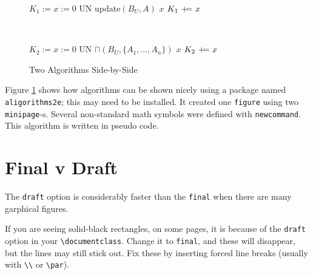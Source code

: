 \begin{figure}[h]
\begin{minipage}{.45\textwidth}
\begin{algorithm}[H]
  $K_1  := x := 0$\;
   {
    UN \bang update$(B_U, A)$ \query $x$\;
    $K_1 \protect{~+{\kern -0.5em}=~} x$\;
  }
~\\
  \caption{$A \sqsubseteq B \Rightarrow U[B] \sqsubseteq U[A]$}
  \label{pseudo-R1-2}
\end{algorithm}
\end{minipage}                  %
~\textcolor{blue}{\vrule}~
\begin{minipage}{.6\textwidth}
\begin{algorithm}[H]
  $K_2 := x := 0$\;
   {
    UN \bang $\sqcap(B_U, \{A_1, \dots, A_n\})$ \query $x$\;
    $K_2 \protect{~+{\kern -0.5em}=~} x$\;
  }
  \label{pseudo-R2-2}
  \caption{{$A_1 \sqcap\dots\sqcap A_n$}
    {$\sqsubseteq B \Rightarrow U[B] \cupEq$}
    {$U[A_1] \cap \dots \cap U[A_n]$}}
\end{algorithm}
\end{minipage}
\caption{Two Algorithms Side-by-Side}
\label{TwoAlgs}
\end{figure}

Figure \ref{TwoAlgs} shows how algorithms can be shown nicely using a
package named {\tt aligorithms2e}; this may need to be installed.  It
created one {\tt figure} using two {\tt minipage}-s.  Several
non-standard math symbols were defined with {\tt newcommand}.
This algorithm is written in pseudo code.

\section{Final v Draft}

The {\tt draft} option is considerably faster than the {\tt final}
when there are many garphical figures.

If you are seeing solid-black rectangles, on some pages, it is because
of the {\tt draft} option in your \verb|\documentclass|.  Change it to
{\tt final}, and these will disappear, but the lines may still stick
out.  Fix these by inserting forced line breaks (usually with
\verb|\\| or \verb|\par|).

